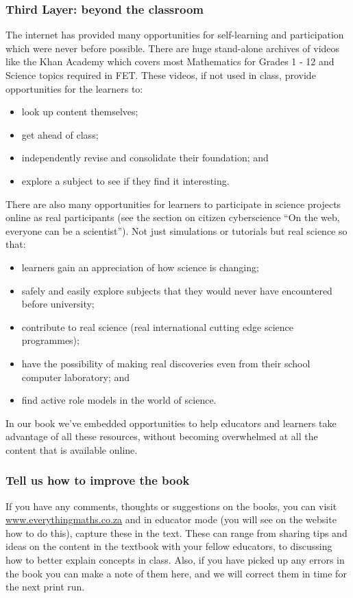 \subsubsection{Third Layer: beyond the classroom}
The internet has provided many opportunities for self-learning and participation which were never before possible. There are huge stand-alone archives of videos like the Khan Academy which covers most Mathematics for Grades 1 - 12 and Science topics required in FET. These videos, if not used in class, provide opportunities for the learners to:
\begin{itemize}[noitemsep]
\item look up content themselves;
\item get ahead of class;
\item independently revise and consolidate their foundation; and
\item explore a subject to see if they find it interesting.
\end{itemize}
There are also many opportunities for learners to participate in science projects online as real participants (see the section on citizen cyberscience “On the web, everyone can be a scientist”). Not just simulations or tutorials but real science so that:
\begin{itemize}[noitemsep]
\item learners gain an appreciation of how science is changing;
\item safely and easily explore subjects that they would never have encountered before university;
\item contribute to real science (real international cutting edge science programmes);
\item have the possibility of making real discoveries even from their school computer laboratory; and
\item find active role models in the world of science.
\end{itemize}
In our book we've embedded opportunities to help educators and learners take advantage of all these resources, without becoming overwhelmed at all the content that is available online. 

\subsubsection{Tell us how to improve the book}
If you have any comments, thoughts or suggestions on the books, you can visit  \underline{www.everythingmaths.co.za} and in educator mode (you will see on the website how to do this), capture these in the text. These can range from sharing tips and ideas on the content in the textbook with your fellow educators, to discussing how to better explain concepts in class. Also, if you have picked up any errors in the book you can make a note of them here, and we will correct them in time for the next print run.\par

